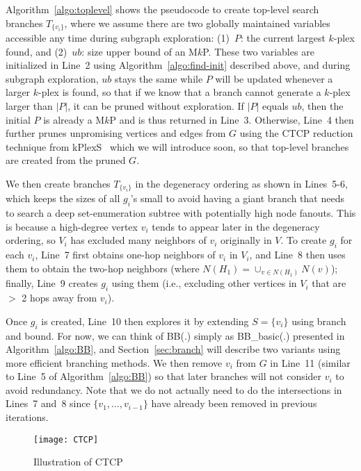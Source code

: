 \documentclass[sigconf, nonacm]{acmart}
\begin{document}
Algorithm~\ref{algo:toplevel} shows the pseudocode to create top-level search branches $T_{\{v_i\}}$, where we assume there are two globally maintained variables accessible any time during subgraph exploration: (1)~$P$: the current largest $k$-plex found, and (2)~$ub$: size upper bound of an M$k$P. These two variables are initialized in Line~2 using Algorithm~\ref{algo:find-init} described above, and during subgraph exploration, $ub$ stays the same while $P$ will be updated whenever a larger $k$-plex is found, so that if we know that a branch cannot generate a $k$-plex larger than $|P|$, it can be pruned without exploration. If $|P|$ equals $ub$, then the initial $P$ is already a M$k$P and is thus returned in Line~3. Otherwise, Line~4 then further prunes unpromising vertices and edges from $G$ using the CTCP reduction technique from kPlexS~\cite{kPlexS} which we will introduce soon, so that top-level branches are created from the pruned $G$.

We then create branches $T_{\{v_i\}}$ in the degeneracy ordering as shown in Lines~5-6, which keeps the sizes of all $g_i$'s small to avoid having a giant branch that needs to search a deep set-enumeration subtree with potentially high node fanouts. This is because a high-degree vertex $v_i$ tends to appear later in the degeneracy ordering, so $V_i$ has excluded many neighbors of $v_i$ originally in $V$. To create $g_i$ for each $v_i$, Line~7 first obtains one-hop neighbors of $v_i$ in $V_i$, and Line~8 then uses them to obtain the two-hop neighbors (where $N(H_1)=\cup_{v\in N(H_1)}N(v)$); finally, Line~9 creates $g_i$ using them (i.e., excluding other vertices in $V_i$ that are $>$ 2 hops away from $v_i$).

Once $g_i$ is created, Line~10 then explores it by extending $S=\{v_i\}$ using branch and bound. For now, we can think of BB(.) simply as BB\_basic(.) presented in Algorithm~\ref{algo:BB}, and Section~\ref{sec:branch} will describe two variants using more efficient branching methods. We then remove $v_i$ from $G$ in Line~11 (similar to Line~5 of Algorithm~\ref{algo:BB}) so that later branches will not consider $v_i$ to avoid redundancy. Note that we do not actually need to do the intersections in Lines~7 and~8 since $\{v_1, \ldots, v_{i-1}\}$ have already been removed in previous iterations.

\begin{figure}[t]
  \texttt{[image: CTCP]}
  \vspace{-7mm}
  \caption{Illustration of CTCP}\label{fig:ctcp}
  \vspace{-6mm}
\end{figure}
\setlength{\textfloatsep}{2pt}
\end{document}
